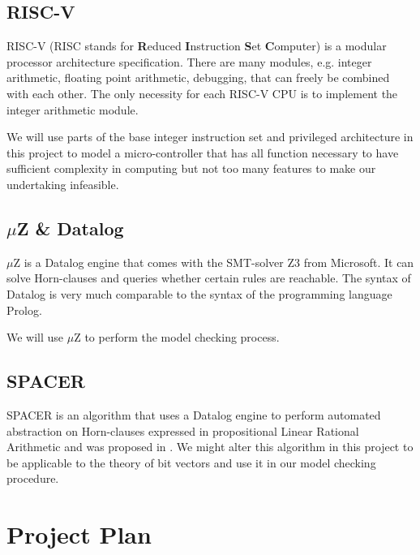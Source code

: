 \documentclass{securem}
\begin{document}
\subsection{RISC-V}

RISC-V (RISC stands for \textbf{R}educed \textbf{I}nstruction \textbf{S}et \textbf{C}omputer) is a modular processor architecture specification.
There are many modules, e.g. integer arithmetic, floating point arithmetic, debugging, that can freely be combined with each other.
The only necessity for each RISC-V CPU is to implement the integer arithmetic module.

We will use parts of the base integer instruction set and privileged architecture in this project to model a micro-controller that has all function necessary to have sufficient complexity in computing but not too many features to make our undertaking infeasible.

\subsection{$ \mu $Z \& Datalog}

$ \mu $Z is a Datalog engine that comes with the SMT-solver Z3 from Microsoft.
It can solve Horn-clauses and queries whether certain rules are reachable.
The syntax of Datalog is very much comparable to the syntax of the programming language Prolog.

We will use $ \mu $Z to perform the model checking process.

\subsection{SPACER}

SPACER is an algorithm that uses a Datalog engine to perform automated abstraction on Horn-clauses expressed in propositional Linear Rational Arithmetic and was proposed in \cite{Komuravelli13}.
We might alter this algorithm in this project to be applicable to the theory of bit vectors and use it in our model checking procedure.

\section{Project Plan}
\end{document}
